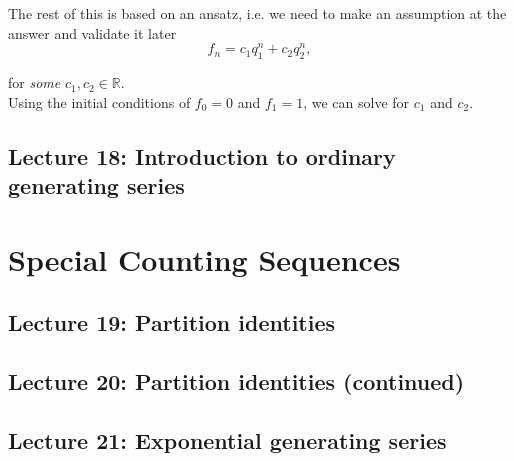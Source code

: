 \documentclass{report}
\begin{document}
{{        The rest of this is based on an ansatz, i.e. 
        we need to make an assumption at the answer and validate it later \\

        $$
        f_n = c_1q_1^n + c_2q_2^n,
        $$

        for \textit{some} $c_1, c_2 \in \mathbb{R}$. \\

        Using the initial conditions of $f_0 = 0$ and $f_1 = 1$, 
        we can solve for $c_1$ and $c_2$.
    }

    \section{Lecture 18: Introduction to ordinary generating series}

    \chapter{Special Counting Sequences}

    \section{Lecture 19: Partition identities}

    \section{Lecture 20: Partition identities (continued)}

    \section{Lecture 21: Exponential generating series}
}
\end{document}
